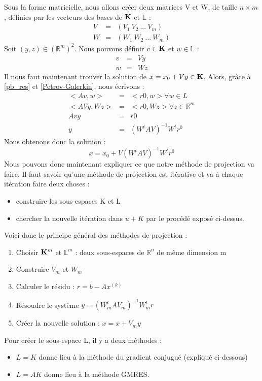 Sous la forme matricielle, nous allons créer deux matrices V et W, de taille $n \times m$,  définies par les vecteurs des bases de $\mathbf{K}$ et $\mathbb{L}$ : 
\begin{eqnarray}
V &=& (V_1 \ V_2 \ ... \ V_m ) \\
W &=& (W_1 \ W_2 \ ... \ W_m )
\end{eqnarray}
Soit $(y, z) \in (\mathbb{R}^m)^2$. Nous pouvons définir $v \in \mathbf{K}$ et $w \in \mathbb{L}$ :
\begin{eqnarray}
v &=& Vy\\
w &=& Wz
\end{eqnarray}
Il nous faut maintenant trouver la solution de $ x = x_0 + Vy \in \mathbf{K}$. Alors, grâce à \ref{pb_res} et \ref{Petrov-Galerkin}, nous écrivons : 
\begin{eqnarray}
<Av, w> &=& <r0, w> \forall w \in L\\
<AVy, Wz> &=& <r0, Wz> \forall z \in \mathbb{R}^m \\
Avy &=& r0 \\
y &=& (W^t A V)^{-1} W^tr^0
\end{eqnarray}
Nous obtenons donc la solution : 
\begin{equation}
x = x_0 + V (W^t A V)^{-1} W^tr^0
\end{equation}
Nous pouvons donc maintenant expliquer ce que notre méthode de projection va faire. Il faut savoir qu'une méthode de projection est itérative et va à chaque itération faire deux choses  :
\begin{itemize}
	\item construire les sous-espaces K et L
	\item chercher la nouvelle itération dans $u + K$ par le procédé exposé ci-dessus.
\end{itemize}
Voici donc le principe général des méthodes de projection : 
\begin{enumerate}
	\item Choisir $\mathbf{K}^m$ et $\mathbb{L}^m$ : deux sous-espaces de $\mathbb{R}^n$ de même dimension m
	\item Construire $V_m$ et $W_m$
	\item Calculer le résidu : $r = b - Ax^{(k)}$
	\item Résoudre le système $y = (W^t_m A V_m)^{-1} W^t_mr$
	\item Créer la nouvelle solution : $x = x + V_m y$
\end{enumerate}
Pour créer le sous-espace L, il y a deux méthodes : 
\begin{itemize}
	\item $L = K$ donne lieu à la méthode du gradient conjugué (expliqué ci-dessous)
	\item $L = AK$ donne lieu à la méthode GMRES.
\end{itemize}
